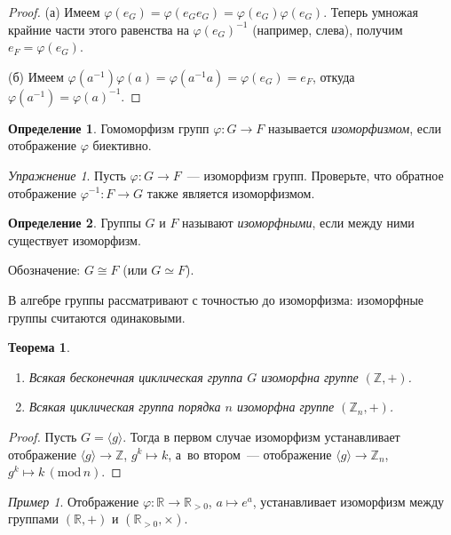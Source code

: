 \documentclass[a4paper,10pt]{amsart}
\def\ZZ{{\mathbb Z}}%
\def\RR{{\mathbb R}}%
\newtheorem{theorem}{Теорема}
\theoremstyle{definition}
\newtheorem{definition}{Определение}
\theoremstyle{remark}
\newtheorem{exc}{Упражнение}
\newtheorem{example}{Пример}
\begin{document}
\vspace{-5mm}

\begin{proof}
(а) Имеем $\varphi(e_G)=\varphi(e_Ge_G)=\varphi(e_G)\varphi(e_G)$.
Теперь умножая крайние части этого равенства на $\varphi(e_G)^{-1}$
(например, слева), получим $e_F = \varphi(e_G)$.

(б) Имеем $\varphi(a^{-1}) \varphi(a) = \varphi(a^{-1}a) =
\varphi(e_G) = e_F$, откуда $\varphi(a^{-1}) = \varphi(a)^{-1}$.
\end{proof}

\begin{definition}
Гомоморфизм групп $\varphi\colon G\to F$ называется {\it
изоморфизмом}, если отображение $\varphi$ биективно.
\end{definition}

\begin{exc}
Пусть $\varphi\colon G\to F$~--- изоморфизм групп. Проверьте, что
обратное отображение $\varphi^{-1}\colon F \to G$ также является
изоморфизмом.
\end{exc}

\begin{definition}
Группы $G$ и $F$ называют {\it изоморфными}, если между ними
существует изоморфизм.

Обозначение: $G\cong F$ (или $G \simeq F$).
\end{definition}

В алгебре группы рассматривают с точностью до изоморфизма:
изоморфные группы считаются \guillemotleft
одинаковыми\guillemotright{}.

\begin{theorem}
\begin{enumerate}
\item[(а)]
Всякая бесконечная циклическая группа $G$ изоморфна группе
$(\ZZ,+)$.
\item[(б)]
Всякая циклическая группа порядка $n$ изоморфна группе $(\ZZ_n,+)$.
\end{enumerate}
\end{theorem}

\begin{proof}
Пусть $G = \langle g \rangle$. Тогда в первом случае изоморфизм
устанавливает отображение $\langle g \rangle \to \ZZ$, $g^k \mapsto
k$, а~во втором~--- отображение $\langle g \rangle \to \ZZ_n$, $g^k
\mapsto k\, (\text{mod}\, n)$.
\end{proof}

\begin{example}
Отображение $\varphi\colon\RR\to\RR_{>0}$, $a\mapsto e^a$,
устанавливает изоморфизм между группами $(\RR,+)$ и
$(\RR_{>0},\times)$.
\end{example}
\end{document}
